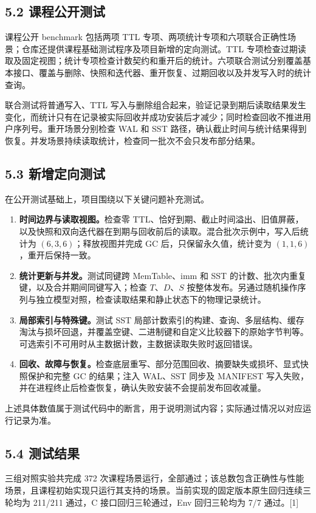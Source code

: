 \documentclass[UTF8,a4paper,10pt,twocolumn,fontset=fandol]{ctexart}
\begin{document}
\subsection*{5.2 课程公开测试}
课程公开 benchmark 包括两项 TTL 专项、两项统计专项和六项联合正确性场景；仓库还提供课程基础测试程序及项目新增的定向测试。TTL 专项检查过期读取及固定视图；统计专项检查计数契约和重开后的统计。六项联合测试分别覆盖基本接口、覆盖与删除、快照和迭代器、重开恢复、过期回收以及并发写入时的统计查询。

联合测试将普通写入、TTL 写入与删除组合起来，验证记录到期后读取结果发生变化，而统计只有在记录被实际回收并成功安装后才减少；同时检查回收不推进用户序列号。重开场景分别检查 WAL 和 SST 路径，确认截止时间与统计结果得到恢复。并发场景持续读取统计，检查同一批次不会只发布部分结果。

\subsection*{5.3 新增定向测试}
在公开测试基础上，项目围绕以下关键问题补充测试。

\begin{enumerate}
\item \textbf{时间边界与读取视图。}检查零 TTL、恰好到期、截止时间溢出、旧值屏蔽，以及快照和双向迭代器在到期与回收前后的读取。混合批次示例中，写入后统计为 $(6,3,6)$；释放视图并完成 GC 后，只保留永久值，统计变为 $(1,1,6)$，重开后保持一致。
\item \textbf{统计更新与并发。}测试同键跨 MemTable、imm 和 SST 的计数、批次内重复键，以及合并期间同键写入；检查 $T$、$D$、$S$ 按整体发布。另通过随机操作序列与独立模型对照，检查读取结果和静止状态下的物理记录统计。
\item \textbf{局部索引与特殊键。}测试 SST 局部计数索引的构建、查询、多层结构、缓存淘汰与损坏回退，并覆盖空键、二进制键和自定义比较器下的原始字节判等。可选索引不可用时从主数据计数，主数据读取失败时返回错误。
\item \textbf{回收、故障与恢复。}检查底层重写、部分范围回收、摘要缺失或损坏、显式快照保护和完整 GC 的结果；注入 WAL、SST 同步及 MANIFEST 写入失败，并在进程终止后检查恢复，确认失败安装不会提前发布回收减量。
\end{enumerate}
上述具体数值属于测试代码中的断言，用于说明测试内容；实际通过情况以对应运行记录为准。

\subsection*{5.4 测试结果}
三组对照实验共完成 372 次课程场景运行，全部通过；该总数包含正确性与性能场景，且课程初始实现只运行其支持的场景。当前实现的固定版本原生回归连续三轮均为 211/211 通过，C 接口回归三轮通过，Env 回归三轮均为 7/7 通过。[1]
\end{document}
